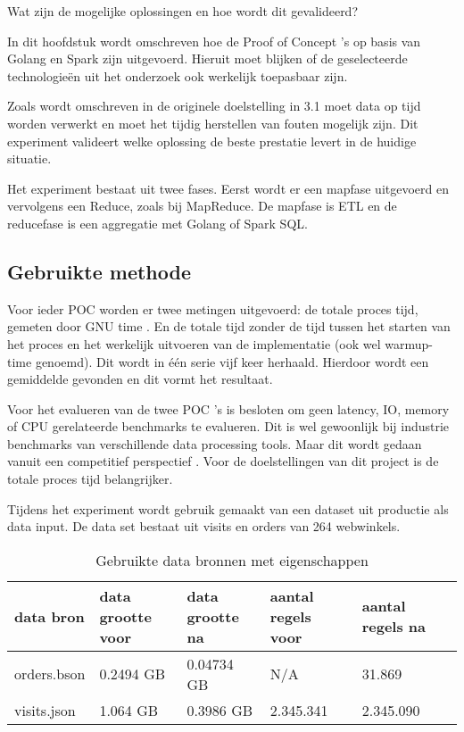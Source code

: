 Wat zijn de mogelijke oplossingen en hoe wordt dit gevalideerd?

In dit hoofdstuk wordt omschreven hoe de Proof of Concept 's op basis van Golang en Spark zijn uitgevoerd. Hieruit moet blijken of de geselecteerde technologieën uit het onderzoek ook werkelijk toepasbaar zijn.

Zoals wordt omschreven in de originele doelstelling in 3.1 moet data op tijd worden verwerkt en moet het tijdig herstellen van fouten mogelijk zijn. Dit experiment valideert welke oplossing de beste prestatie levert in de huidige situatie.

Het experiment bestaat uit twee fases. Eerst wordt er een mapfase uitgevoerd en vervolgens een Reduce, zoals bij MapReduce. De mapfase is 
ETL en de reducefase is een aggregatie met Golang of Spark SQL.

\subsection{Gebruikte methode}

Voor ieder POC worden er twee metingen uitgevoerd: de totale proces tijd, gemeten door GNU time \parencite{gnu_time}. En de totale tijd zonder de tijd tussen het starten van het proces en het werkelijk uitvoeren van de implementatie (ook wel warmup-time genoemd). Dit wordt in één serie vijf keer herhaald. Hierdoor wordt een gemiddelde gevonden en dit vormt het resultaat.

Voor het evalueren van de twee POC 's is besloten om geen latency, IO, memory of CPU gerelateerde benchmarks te evalueren. Dit is wel gewoonlijk bij industrie benchmarks van verschillende data processing tools. Maar dit wordt gedaan vanuit een competitief perspectief  \parencite{ousterhout2015making}. Voor de doelstellingen van dit project is de totale proces tijd belangrijker.

Tijdens het experiment wordt gebruik gemaakt van een dataset uit productie als data input. De data set bestaat uit visits en orders van 264 webwinkels.

\begin{table}[h]
\centering
\caption{Gebruikte data bronnen met eigenschappen}
\label{tab:datasets}
\begin{tabular}{|l|l|l|l|l|l|}
\hline
data bron & data grootte voor & data grootte na & aantal regels voor & aantal regels na \\ \hline
orders.bson    &  0.2494 GB & 0.04734 GB       & N/A                & 31.869           \\ \hline
visits.json & 1.064 GB               & 0.3986 GB      & 2.345.341          & 2.345.090        \\ \hline
\end{tabular}
\end{table}

